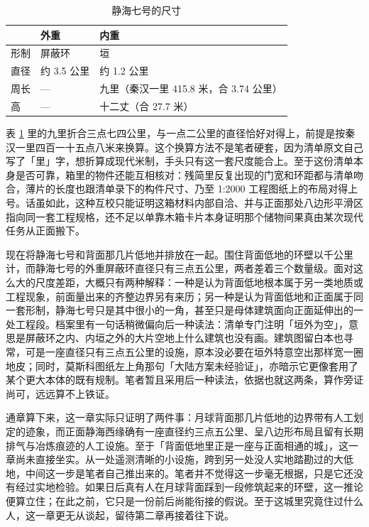 \begin{table}[htbp]
  \centering
  \caption{静海七号的尺寸}
  \label{tab:mt07}
  \begin{tabular}{@{}lll@{}}
    \toprule
    & 外重 & 内重\\
    \midrule
    形制 & 屏蔽环 & 垣 \\
    直径 & 约 3.5 公里 & 约 1.2 公里\\
    周长 & — & 九里（秦汉一里 415.8 米，合 3.74 公里）\\
    高 & — & 十二丈（合 27.7 米）\\
    \bottomrule
  \end{tabular}
\end{table}

表 \ref{tab:mt07} 里的九里折合三点七四公里，与一点二公里的直径恰好对得上，前提是按秦汉一里四百一十五点八米来换算。这个换算方法不是笔者硬套，因为清单原文自己写了「里」字，想折算成现代米制，手头只有这一套尺度能合上。至于这份清单本身是否可靠，箱里的物件还能互相核对：残简里反复出现的门宽和环距都与清单吻合，薄片的长度也跟清单录下的构件尺寸、乃至 1:2000 工程图纸上的布局对得上号。话虽如此，这种互校只能证明这箱材料内部自洽、并与正面那处八边形平滑区指向同一套工程规格，还不足以单靠木箱卡片本身证明那个储物间果真由某次现代任务从正面搬下。

现在将静海七号和背面那几片低地并排放在一起。围住背面低地的环壁以千公里计，而静海七号的外重屏蔽环直径只有三点五公里，两者差着三个数量级。面对这么大的尺度差距，大概只有两种解释：一种是认为背面低地根本属于另一类地质或工程现象，前面量出来的齐整边界另有来历；另一种是认为背面低地和正面属于同一套形制，静海七号只是其中很小的一角，甚至只是母体建筑面向正面延伸出的一处工程段。档案里有一句话稍微偏向后一种读法：清单专门注明「垣外为空」，意思是屏蔽环之内、内垣之外的大片空地上什么建筑也没有画。建筑图留白本也寻常，可是一座直径只有三点五公里的设施，原本没必要在垣外特意空出那样宽一圈地皮；同时，莫斯科图纸左上角那句「大陆方案未经验证」，亦暗示它更像套用了某个更大本体的既有规制。笔者暂且采用后一种读法，依据也就这两条，算作旁证尚可，远远算不上铁证。

通章算下来，这一章实际只证明了两件事：月球背面那几片低地的边界带有人工划定的迹象，而正面静海西缘确有一座直径约三点五公里、呈八边形布局且留有长期排气与冶炼痕迹的人工设施。至于「背面低地里正是一座与正面相通的城」，这一章尚未直接坐实。从一处遥测清晰的小设施，跨到另一处没人实地踏勘过的大低地，中间这一步是笔者自己推出来的。笔者并不觉得这一步毫无根据，只是它还没有经过实地检验。如果日后真有人在月球背面踩到一段修筑起来的环壁，这一推论便算立住；在此之前，它只是一份前后尚能衔接的假说。至于这城里究竟住过什么人，这一章更无从谈起，留待第二章再接着往下说。
